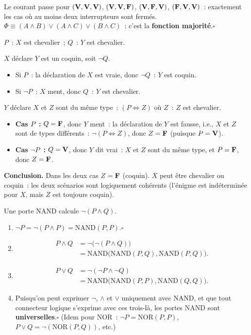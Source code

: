 Le courant passe pour $(\textbf{V},\textbf{V},\textbf{V})$, $(\textbf{V},\textbf{V},\textbf{F})$,
$(\textbf{V},\textbf{F},\textbf{V})$, $(\textbf{F},\textbf{V},\textbf{V})$~: exactement les cas o\`u au moins
deux interrupteurs sont ferm\'es. $\Phi\equiv(A\land B)\lor(A\land C)\lor(B\land C)$~:
c'est la \textbf{fonction majorit\'e}.\hfill$\square$


$P$~: \og$X$ est chevalier\fg~; $Q$~: \og$Y$ est chevalier\fg.

$X$ d\'eclare \og$Y$ est un coquin\fg, soit $\lnot Q$.
\begin{itemize}
  \item Si $P$~: la d\'eclaration de $X$ est vraie, donc $\lnot Q$~: $Y$ est coquin.
  \item Si $\lnot P$~: $X$ ment, donc $Q$~: $Y$ est chevalier.
\end{itemize}
$Y$ d\'eclare \og$X$ et $Z$ sont du m\^eme type\fg~: $(P\Leftrightarrow Z)$ o\`u $Z$~: \og$Z$ est chevalier\fg.
\begin{itemize}
  \item \textbf{Cas $P$~:} $Q=\textbf{F}$, donc $Y$ ment~: la d\'eclaration de $Y$ est fausse,
        i.e., $X$ et $Z$ sont de types diff\'erents~: $\lnot(P\Leftrightarrow Z)$,
        donc $Z=\textbf{F}$ (puisque $P=\textbf{V}$).
  \item \textbf{Cas $\lnot P$~:} $Q=\textbf{V}$, donc $Y$ dit vrai~:
        $X$ et $Z$ sont du m\^eme type, et $P=\textbf{F}$, donc $Z=\textbf{F}$.
\end{itemize}
\textbf{Conclusion.}
Dans les deux cas $Z=\textbf{F}$ (coquin). $X$ peut \^etre chevalier ou coquin~:
les deux sc\'enarios sont logiquement coh\'erents (l'\'enigme est ind\'etermin\'ee
pour $X$, mais $Z$ est toujours coquin).


Une porte NAND calcule $\lnot(P\land Q)$.

\begin{enumerate}
  \item $\lnot P = \lnot(P\land P) = \text{NAND}(P,P)$.\hfill$\square$
  \item \begin{align*}
        P\land Q
        &= \lnot\bigl(\lnot(P\land Q)\bigr)\\
        &= \text{NAND}\bigl(\text{NAND}(P,Q),\text{NAND}(P,Q)\bigr).
        \end{align*}
  \item \begin{align*}
        P\lor Q
        &= \lnot(\lnot P\land\lnot Q)\\
        &= \text{NAND}\bigl(\text{NAND}(P,P),\text{NAND}(Q,Q)\bigr).
        \end{align*}
  \item Puisqu'on peut exprimer $\lnot$, $\land$ et $\lor$ uniquement avec NAND,
        et que tout connecteur logique s'exprime avec ces trois-l\`a,
        les portes NAND sont \textbf{universelles}.\hfill$\square$
        (Idem pour NOR~: $\lnot P=\text{NOR}(P,P)$, $P\lor Q=\lnot(\text{NOR}(P,Q))$,
        etc.)
\end{enumerate}

